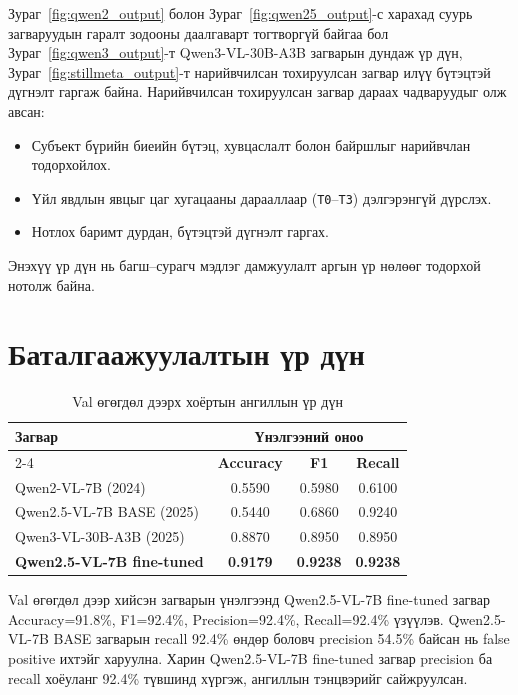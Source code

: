 Зураг~\ref{fig:qwen2_output} болон Зураг~\ref{fig:qwen25_output}-с харахад суурь
загваруудын гаралт зодооны даалгаварт тогтворгүй байгаа бол
Зураг~\ref{fig:qwen3_output}-т Qwen3-VL-30B-A3B загварын дундаж үр дүн, Зураг~\ref{fig:stillmeta_output}-т нарийвчилсан тохируулсан загвар илүү бүтэцтэй
дүгнэлт гаргаж байна. Нарийвчилсан тохируулсан загвар дараах чадваруудыг олж авсан:

\begin{itemize}
    \item Субъект бүрийн биеийн бүтэц, хувцаслалт болон байршлыг нарийвчлан тодорхойлох.
    \item Үйл явдлын явцыг цаг хугацааны дарааллаар (\texttt{T0}--\texttt{T3}) дэлгэрэнгүй дүрслэх.
    \item Нотлох баримт дурдан, бүтэцтэй дүгнэлт гаргах.
\end{itemize}

Энэхүү үр дүн нь багш--сурагч мэдлэг дамжуулалт аргын
үр нөлөөг тодорхой нотолж байна.

\section{Баталгаажуулалтын үр дүн}

\begin{table}[htbp]
\centering
\caption{Val өгөгдөл дээрх хоёртын ангиллын үр дүн}
\label{tab:intensity_results}
{\small
\begin{tabular}{lccc}
\hline
\multirow{2}{*}{\textbf{Загвар}} & \multicolumn{3}{c}{\textbf{Үнэлгээний оноо}} \\
\cline{2-4}
& \textbf{Accuracy} & \textbf{F1} & \textbf{Recall} \\
\hline
Qwen2-VL-7B (2024) & 0.5590 & 0.5980 & 0.6100 \\
Qwen2.5-VL-7B BASE (2025) & 0.5440 & 0.6860 & 0.9240 \\
Qwen3-VL-30B-A3B (2025) & 0.8870 & 0.8950 & 0.8950 \\
\textbf{Qwen2.5-VL-7B fine-tuned} & \textbf{0.9179} & \textbf{0.9238} & \textbf{0.9238} \\
\hline
\end{tabular}
}
\end{table}

\begin{sloppypar}
Val өгөгдөл дээр хийсэн загварын үнэлгээнд Qwen2.5-VL-7B fine-tuned загвар Accuracy=91.8\%, F1=92.4\%, Precision=92.4\%, Recall=92.4\% үзүүлэв. Qwen2.5-VL-7B BASE загварын recall 92.4\% өндөр боловч precision 54.5\% байсан нь false positive ихтэйг харуулна. Харин Qwen2.5-VL-7B fine-tuned загвар precision ба recall хоёуланг 92.4\% түвшинд хүргэж, ангиллын тэнцвэрийг сайжруулсан.
\end{sloppypar}

